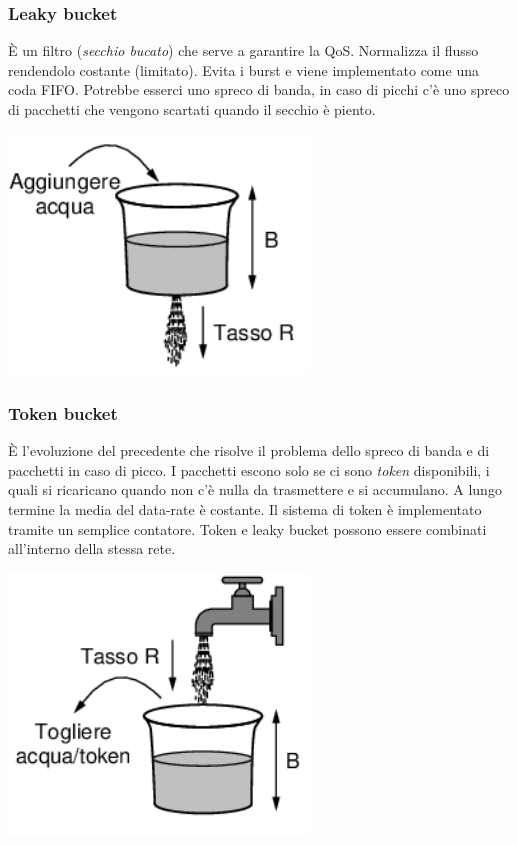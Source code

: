 \documentclass[10pt,a4paper,twoside]{article}
\begin{document}
\subsubsection{Leaky bucket}
\begin{minipage}{0.75\textwidth}
È un filtro (\textit{secchio bucato}) che serve a garantire la QoS. Normalizza il flusso rendendolo costante (limitato). Evita i burst e viene implementato come una coda FIFO. Potrebbe esserci uno spreco di banda, in caso di picchi c'è uno spreco di pacchetti che vengono scartati quando il secchio è piento.
\end{minipage}
\begin{minipage}{0.25\textwidth}
\begin{center}
\includegraphics[width=0.6\textwidth]{images/leaky_bucket.png}
\end{center}
\end{minipage}

\subsubsection{Token bucket}
\begin{minipage}{0.75\textwidth}
È l'evoluzione del precedente che risolve il problema dello spreco di banda e di pacchetti in caso di picco. I pacchetti escono solo se ci sono \textit{token} disponibili, i quali si ricaricano quando non c'è nulla da trasmettere e si accumulano. A lungo termine la media del data-rate è costante. Il sistema di token è implementato tramite un semplice contatore. Token e leaky bucket possono essere combinati all'interno della stessa rete.
\end{minipage}
\begin{minipage}{0.25\textwidth}
\begin{center}
\includegraphics[width=0.6\textwidth]{images/token_bucket.png}
\end{center}
\end{minipage}
\end{document}
